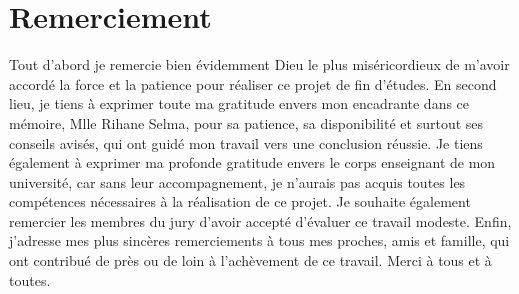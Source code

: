 \chapter*{Remerciement}
Tout d’abord je remercie bien évidemment Dieu le plus miséricordieux de m'avoir accordé la force et la patience pour réaliser ce projet de fin d'études.
En second lieu, je tiens à exprimer toute ma gratitude envers mon encadrante dans ce mémoire, Mlle Rihane Selma, pour sa patience, sa disponibilité et surtout ses conseils avisés, qui ont guidé mon travail vers une conclusion réussie.
Je tiens également à exprimer ma profonde gratitude envers le corps enseignant de mon université, car sans leur accompagnement, je n'aurais pas acquis toutes les compétences nécessaires à la réalisation de ce projet.
Je souhaite également remercier les membres du jury d'avoir accepté d'évaluer ce travail modeste.
Enfin, j'adresse mes plus sincères remerciements à tous mes proches, amis et famille, qui ont contribué de près ou de loin à l'achèvement de ce travail. Merci à tous et à toutes.